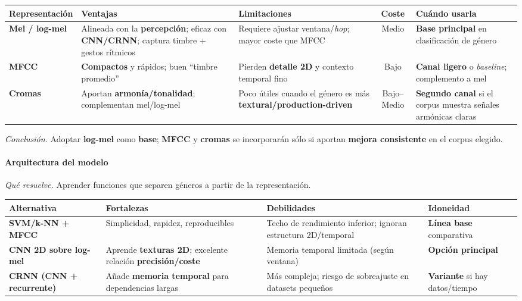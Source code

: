 \documentclass[12pt,twoside]{article}
\begin{document}
\begin{table}[h!]
  \centering
  \setlength{\tabcolsep}{4pt}
  \renewcommand{\arraystretch}{1.2}
  \footnotesize
  \begin{tabularx}{\textwidth}{l Y Y C Y}
    \toprule
    \textbf{Representación} & \textbf{Ventajas} & \textbf{Limitaciones} & \textbf{Coste} & \textbf{Cuándo usarla} \\
    \midrule
    \textbf{Mel / log-mel} & Alineada con la \textbf{percepción}; eficaz con \textbf{CNN/CRNN}; captura timbre + gestos rítmicos & Requiere ajustar ventana/\textit{hop}; mayor coste que MFCC & Medio & \textbf{Base principal} en clasificación de género \\
    \textbf{MFCC} & \textbf{Compactos} y rápidos; buen “timbre promedio” & Pierden \textbf{detalle 2D} y contexto temporal fino & Bajo & \textbf{Canal ligero} o \textit{baseline}; complemento a mel \\
    \textbf{Cromas} & Aportan \textbf{armonía/tonalidad}; complementan mel/log-mel & Poco útiles cuando el género es más \textbf{textural/production-driven} & Bajo--Medio & \textbf{Segundo canal} si el corpus muestra señales armónicas claras \\
    \bottomrule
  \end{tabularx}
\end{table}

\textit{Conclusión.} Adoptar \textbf{log-mel} como \textbf{base}; \textbf{MFCC} y \textbf{cromas} se incorporarán sólo si aportan \textbf{mejora consistente} en el corpus elegido.

\paragraph*{Arquitectura del modelo}

\textit{Qué resuelve.} Aprender funciones que separen géneros a partir de la representación.

\begin{table}[h!]
  \centering
  \setlength{\tabcolsep}{4pt}
  \renewcommand{\arraystretch}{1.2}
  \footnotesize
  \begin{tabularx}{\textwidth}{l Y Y Y}
    \toprule
    \textbf{Alternativa} & \textbf{Fortalezas} & \textbf{Debilidades} & \textbf{Idoneidad} \\
    \midrule
    \textbf{SVM/k-NN + MFCC} & Simplicidad, rapidez, reproducibles & Techo de rendimiento inferior; ignoran estructura 2D/temporal & \textbf{Línea base} comparativa \\
    \textbf{CNN 2D sobre log-mel} & Aprende \textbf{texturas 2D}; excelente relación \textbf{precisión/coste} & Memoria temporal limitada (según ventana) & \textbf{Opción principal} \\
    \textbf{CRNN (CNN + recurrente)} & Añade \textbf{memoria temporal} para dependencias largas & Más compleja; riesgo de sobreajuste en datasets pequeños & \textbf{Variante} si hay datos/tiempo \\
    \bottomrule
  \end{tabularx}
\end{table}
\end{document}
